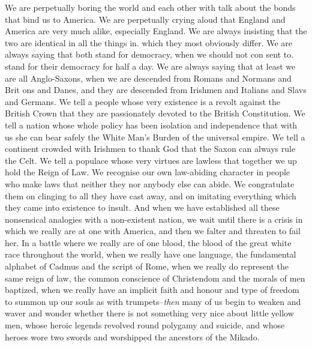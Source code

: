 \documentclass{book}
\begin{document}
We are perpetually boring the world and each other with talk about the bonds that bind us to America. We are perpetually crying aloud that England and America are very much alike, especially England. We are always insisting that the two are identical in all the things in. which they most obviously differ. We are always saying that both stand for democracy, when we should not con sent to. stand for their democracy for half a day. We are always saying that at least we are all Anglo-Saxons, when we are descended from Romans and Normans and Brit ons and Danes, and they are descended from Irishmen and Italians and Slavs and Germans. We tell a people whose very existence is a revolt against the British Crown that they are passionately devoted to the British Constitution. We tell a nation whose whole policy has been isolation and independence that with us she can bear safely the White Man’s Burden of the universal empire. We tell a continent crowded with Irishmen to thank God that the Saxon can always rule the Celt. We tell a populace whose very virtues are lawless that together we up hold the Reign of Law. We recognise our own law-abiding character in people who make laws that neither they nor anybody else can abide. We congratulate them on clinging to all they have cast away, and on imitating everything which they came into existence to insult. And when we have established all these nonsensical analogies with a non-existent nation, we wait until there is a crisis in which we really are at one with America, and then we falter and threaten to fail her. In a battle where we really are of one blood, the blood of the great white race throughout the world, when we really have one language, the fundamental alphabet of Cadmus and the script of Rome, when we really do represent the same reign of law, the common conscience of Christendom and the morals of men baptized, when we really have an implicit faith and honour and type of freedom to summon up our souls as with trumpets–\emph{then} many of us begin to weaken and waver and wonder whether there is not something very nice about little yellow men, whose heroic legends revolved round polygamy and suicide, and whose heroes wore two swords and worshipped the ancestors of the Mikado.
\end{document}
